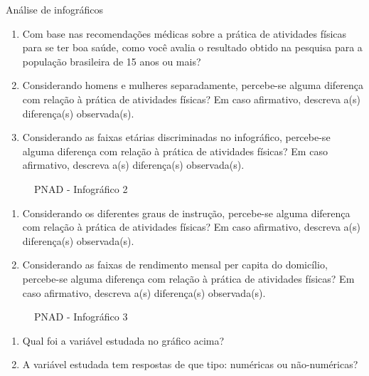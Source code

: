 \begin{task}{ Análise de infográficos}
\begin{enumerate}
\item {} 
Com base nas recomendações médicas sobre a prática de atividades físicas para se ter boa saúde, como você avalia o resultado obtido na pesquisa para a população brasileira de 15 anos ou mais?

\item {} 
Considerando homens e mulheres separadamente, percebe-se alguma diferença com relação à prática de atividades físicas? Em caso afirmativo, descreva a(s) diferença(s) observada(s).

\item {} 
Considerando as faixas etárias discriminadas no infográfico, percebe-se alguma diferença com relação à prática de atividades físicas? Em caso afirmativo, descreva a(s) diferença(s) observada(s).

\end{enumerate}

\begin{figure}[H]
\centering
\capstart

\noindent{}
\caption{PNAD - Infográfico 2}\label{\detokenize{PE103-0:fig-infografico-pnad-2}}\label{\detokenize{PE103-0:id2}}\end{figure}
\begin{enumerate}
\item {} 
Considerando os diferentes graus de instrução, percebe-se alguma diferença com relação à prática de atividades físicas? Em caso afirmativo, descreva a(s) diferença(s) observada(s).

\item {} 
Considerando as faixas de rendimento mensal per capita do domicílio, percebe-se alguma diferença com relação à prática de atividades físicas? Em caso afirmativo, descreva a(s) diferença(s) observada(s).

\end{enumerate}

\begin{figure}[H]
\centering
\capstart

\noindent{}
\caption{PNAD - Infográfico 3}\label{\detokenize{PE103-0:fig-infografico-pnad-3}}\label{\detokenize{PE103-0:id3}}\end{figure}
\begin{enumerate}
\item {} 
Qual foi a variável estudada no gráfico acima?

\item {} 
A variável estudada tem respostas de que tipo: numéricas ou não-numéricas?


\end{enumerate}
\end{task}
